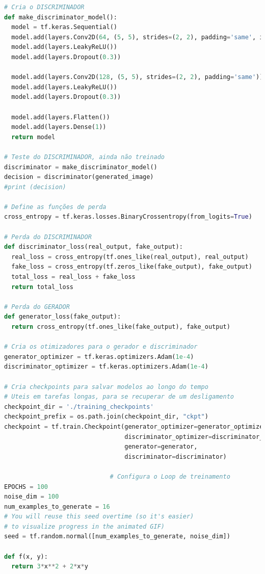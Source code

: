 \begin{lstlisting}[language=Python, style=input]
# Cria o DISCRIMINADOR
def make_discriminator_model():
  model = tf.keras.Sequential()
  model.add(layers.Conv2D(64, (5, 5), strides=(2, 2), padding='same', input_shape=[28, 28, 1]))
  model.add(layers.LeakyReLU())
  model.add(layers.Dropout(0.3))

  model.add(layers.Conv2D(128, (5, 5), strides=(2, 2), padding='same'))
  model.add(layers.LeakyReLU())
  model.add(layers.Dropout(0.3))

  model.add(layers.Flatten())
  model.add(layers.Dense(1))
  return model

# Teste do DISCRIMINADOR, ainda não treinado
discriminator = make_discriminator_model()
decision = discriminator(generated_image)
#print (decision)

# Define as funções de perda
cross_entropy = tf.keras.losses.BinaryCrossentropy(from_logits=True)

# Perda do DISCRIMINADOR
def discriminator_loss(real_output, fake_output):
  real_loss = cross_entropy(tf.ones_like(real_output), real_output)
  fake_loss = cross_entropy(tf.zeros_like(fake_output), fake_output)
  total_loss = real_loss + fake_loss
  return total_loss

# Perda do GERADOR
def generator_loss(fake_output):
  return cross_entropy(tf.ones_like(fake_output), fake_output)

# Cria os otimizadores para o gerador e discriminador
generator_optimizer = tf.keras.optimizers.Adam(1e-4)
discriminator_optimizer = tf.keras.optimizers.Adam(1e-4)

# Cria checkpoints para salvar modelos ao longo do tempo
# Uteis em tarefas longas, para se recuperar de um desligamento
checkpoint_dir = './training_checkpoints'
checkpoint_prefix = os.path.join(checkpoint_dir, "ckpt")
checkpoint = tf.train.Checkpoint(generator_optimizer=generator_optimizer,
                                 discriminator_optimizer=discriminator_optimizer,
                                 generator=generator,
                                 discriminator=discriminator)

                             # Configura o Loop de treinamento
EPOCHS = 100
noise_dim = 100
num_examples_to_generate = 16
# You will reuse this seed overtime (so it's easier)
# to visualize progress in the animated GIF)
seed = tf.random.normal([num_examples_to_generate, noise_dim])

def f(x, y):
  return 3*x**2 + 2*x*y


\end{lstlisting}
